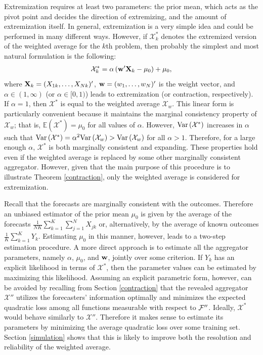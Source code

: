 \documentclass[11pt]{article}
\newcommand{\E}{\mathbb{E}}
\theoremstyle{definition}
\theoremstyle{definition}
\def\w{{\bf w}}
\def\X{{\bf X}}
\def\F{{\cal F}}
\def\E{{\mathbb E}}
\def\Var{{\rm Var}\,}
\begin{document}
Extremization requires at least two parameters: the prior mean, which acts as the pivot point and decides the direction of extremizing, and the amount of extremization itself.  In general, extremization is a very simple idea and could be performed in many different ways. However, if $\mathcal{X}_k^*$ denotes the extremized version of the weighted average for the $k$th problem, then probably the simplest and most natural formulation is the following:
\begin{align*}
\mathcal{X}_k^* = \alpha  \left(  \w'\X_{k} - \mu_0\right) + \mu_0,
\end{align*}
 where $\X_k = (X_{1k}, \dots, X_{Nk})'$, $\w = (w_1, \dots, w_N)'$ is the weight vector, and $\alpha \in (1, \infty)$ (or $\alpha \in [0, 1)$) leads to extremization (or contraction, respectively). If $\alpha = 1$, then $\mathcal{X}^*$ is equal to the weighted average $\mathcal{X}_w$.  This linear form is particularly convenient because it maintains the marginal consistency property of $\mathcal{X}_w$; that is, $\E(\mathcal{X}^*) = \mu_0$ for all values of $\alpha$.  However, $\Var(\mathcal{X}^*)$ increases in $\alpha$ such that $\Var(\mathcal{X}^*) = \alpha^2 \Var(\mathcal{X}_w) > \Var(\mathcal{X}_w)$ for all $\alpha > 1$. Therefore, for a large enough $\alpha$, $\mathcal{X}^*$ is both marginally consistent and expanding. These properties hold even if the weighted average is replaced by some other marginally consistent aggregator. However, given that the main purpose of this procedure is to illustrate Theorem \ref{contraction}, only the weighted average is considered for extremization.

Recall that the forecasts are marginally consistent with the outcomes. Therefore an unbiased estimator of the prior mean $\mu_0$ is given by the average of the forecasts $\frac{1}{NK} \sum_{k=1}^K\sum_{j=1}^N X_{jk}$ or, alternatively, by the average of known outcomes $\frac{1}{K} \sum_{k=1}^K Y_k$. Estimating $\mu_0$ in this manner, however, leads to a two-step estimation procedure. A more direct approach is to estimate all the aggregator parameters, namely $\alpha$, $\mu_0$, and $\w$, jointly over some criterion. If $Y_k$ has an explicit likelihood in terms of $\mathcal{X}^*$, then the parameter values can be estimated by maximizing this likelihood. Assuming an explicit parametric form, however, can be avoided by recalling from Section \ref{contraction} that the revealed aggregator $\mathcal{X}''$ utilizes the forecasters' information optimally and minimizes the expected quadratic loss among all functions measurable with respect to $\F''$. Ideally, $\mathcal{X}^*$ would behave similarly to $\mathcal{X}''$. Therefore it makes sense to estimate its parameters by minimizing the average quadratic loss over some training set. Section \ref{simulation} shows that this is likely to improve both the resolution and reliability of the weighted average. 
\end{document}

